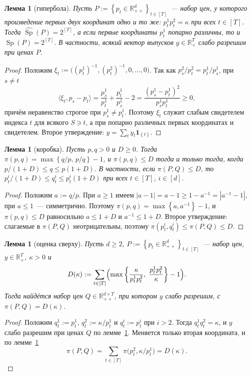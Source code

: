 \documentclass[a4paper,11pt]{article}
\theoremstyle{plain}
\newtheorem{lemma}[theorem]{Лемма}
\theoremstyle{definition}
\theoremstyle{remark}
\newcommand{\R}{\mathbb{R}}
\newcommand{\abs}[1]{\left\lvert #1 \right\rvert}
\newcommand{\set}[1]{\left\{ #1 \right\}}
\newcommand{\ip}[2]{\langle #1, #2\rangle} %
\newcommand{\Rpp}[1][2]{\R^{#1}_{++}} %
\newcommand{\Rp}[1][2]{\R^{#1}_{+}}   %
\DeclareMathOperator{\Sp}{Sp}
\begin{document}
\begin{lemma}[гипербола]\label{lem:full}
    Пусть $P:=\set{p_t\in\Rpp[d]}_{t\in[T]}$~--- набор цен, у которого произведение первых двух координат одно и то же: $p^1_tp^2_t=\kappa$ при всех $t\in[T]$. Тогда $\widehat{\Sp}(P)=2^{[T]}$, а если первые координаты $p^1_t$ попарно различны, то и $\Sp(P)=2^{[T]}$. В частности, всякий вектор выпусков $y\in\Rp[T]$ слабо разрешим при ценах $P$.
\end{lemma}

\begin{proof}
    Положим $\xi_t:=\bigl((p^1_t)^{-1},(p^2_t)^{-1},0,\dots,0\bigr)$. Так как $p^2_s/p^2_t=p^1_t/p^1_s$, при $s\ne t$
    \[
        \ip{\xi_t}{p_s-p_t}=\frac{p^1_s}{p^1_t}+\frac{p^1_t}{p^1_s}-2=\frac{(p^1_s-p^1_t)^2}{p^1_sp^1_t}\ge0,
    \]
    причём неравенство строгое при $p^1_s\ne p^1_t$. Поэтому $\xi_t$ служит слабым свидетелем индекса $t$ для всякого $S\ni t$, а при попарно различных первых координатах и свидетелем. Второе утверждение: $y=\sum_ty_t\mathbf 1_{\set t}$.
\end{proof}

\begin{lemma}[коробка]\label{lem:box}
    Пусть $p,q>0$ и $D\ge0$. Тогда $\pi(p,q)=\max\set{q/p,\,p/q}-1$, и $\pi(p,q)\le D$ тогда и только тогда, когда $p/(1+D)\le q\le p(1+D)$. В частности, если $\pi(P,Q)\le D$, то $p^i_t/(1+D)\le q^i_t\le p^i_t(1+D)$ при всех $t\in[T]$, $i\in[d]$.
\end{lemma}

\begin{proof}
    Положим $a:=q/p$. При $a\ge1$ имеем $\abs{a-1}=a-1\ge1-a^{-1}=\abs{a^{-1}-1}$, при $a\le1$~--- симметрично. Поэтому $\pi(p,q)=\max\set{a,a^{-1}}-1$, и $\pi(p,q)\le D$ равносильно $a\le1+D$ и $a^{-1}\le1+D$. Второе утверждение: слагаемые в $\pi(P,Q)$ неотрицательны, поэтому $\pi(p^i_t,q^i_t)\le\pi(P,Q)\le D$.
\end{proof}

\begin{lemma}[оценка сверху]\label{lem:bound}
    Пусть $d\ge2$, $P:=\set{p_t\in\Rpp[d]}_{t\in[T]}$~--- набор цен, $y\in\Rp[T]$, $\kappa>0$ и
    \[
        D(\kappa):=\sum_{t\in[T]}\Bigl(\max\set{\frac{\kappa}{p^1_tp^2_t},\ \frac{p^1_tp^2_t}{\kappa}}-1\Bigr).
    \]
    Тогда найдётся набор цен $Q\in\Rpp[d\times T]$, при котором $y$ слабо разрешим, с $\pi(P,Q)=D(\kappa)$.
\end{lemma}

\begin{proof}
    Положим $q^1_t:=p^1_t$, $q^2_t:=\kappa/p^1_t$ и $q^i_t:=p^i_t$ при $i>2$. Тогда $q^1_tq^2_t=\kappa$, и $y$ слабо разрешим при ценах $Q$ по лемме~\ref{lem:full}. Меняется только вторая координата, и по лемме~\ref{lem:box}
    \[
        \pi(P,Q)=\sum_{t\in[T]}\pi\bigl(p^2_t,\kappa/p^1_t\bigr)=D(\kappa).
    \]
\end{proof}
\end{document}
